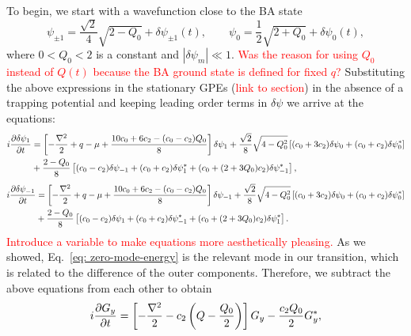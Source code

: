 To begin, we start with a wavefunction close to the BA state
\begin{equation}
    \psi_{\pm 1} = \frac{\sqrt{2}}{4}\sqrt{2 - Q_0} + \delta\psi_{\pm 1}(t),
    \qquad
    \psi_0 = \frac{1}{2}\sqrt{2 + Q_0} + \delta \psi_0(t),
\end{equation}
where \( 0 < Q_0 < 2 \) is a constant and \( |\delta\psi_m| \ll 1 \).
\textcolor{red}{Was the reason for using \( Q_0 \) instead of \( Q(t) \) because
the BA ground state is defined for fixed \( q \)?}
Substituting the above expressions in the stationary GPEs
(\textcolor{red}{link to section}) in the absence of a trapping potential and
keeping leading order terms in \( \delta\psi \) we arrive at the equations:
\begin{equation}
    \begin{aligned}
        i\pdv{\delta\psi_1}{t} &= \left[-\frac{\nabla^2}{2} + q - \mu 
        + \frac{10c_0+6c_2-(c_0-c_2)Q_0}{8}\right]\delta\psi_1 
        + \frac{\sqrt{2}}{8}\sqrt{4-Q_0^2}\left[(c_0+3c_2)\delta\psi_0 
        + (c_0+c_2)\delta\psi_0^*\right] \\
        &+ \frac{2-Q_0}{8}\left[(c_0-c_2)\delta\psi_{-1}
        + (c_0+c_2)\delta\psi_1^* 
        + (c_0 + (2+3Q_0)c_2)\delta\psi_{-1}^*\right],
    \end{aligned}
\end{equation}
\begin{equation} 
    \begin{aligned}
        i\pdv{\delta\psi_{-1}}{t} &= \left[-\frac{\nabla^2}{2} + q - \mu 
        + \frac{10c_0+6c_2-(c_0-c_2)Q_0}{8}\right]\delta\psi_{-1} 
        + \frac{\sqrt{2}}{8}\sqrt{4-Q_0^2}\left[(c_0+3c_2)\delta\psi_0 
        + (c_0+c_2)\delta\psi_0^*\right] \\
        &+ \frac{2-Q_0}{8}\left[(c_0-c_2)\delta\psi_{1}
        + (c_0+c_2)\delta\psi_{-1}^* 
        + (c_0 + (2+3Q_0)c_2)\delta\psi_{1}^*\right].
    \end{aligned}
\end{equation}
\textcolor{red}{Introduce a variable to make equations more aesthetically
pleasing.}
As we showed, Eq.~\eqref{eq: zero-mode-energy} is the relevant mode in our
transition, which is related to the difference of the outer components.
Therefore, we subtract the above equations from each other to obtain
\begin{equation}
    i\pdv{G_y}{t} = \left[-\frac{\nabla^2}{2} - c_2\left(Q 
    - \frac{Q_0}{2}\right)\right]G_y - \frac{c_2Q_0}{2}G_y^*,
\end{equation}
